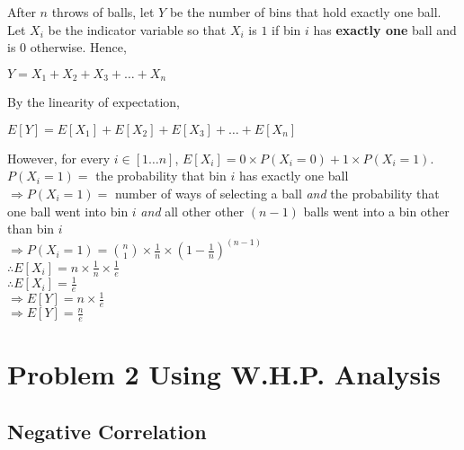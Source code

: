 \documentclass{article}
\begin{document}
After $n$ throws of balls, let $Y$ be the number of bins that hold
exactly one ball. Let $X_i$ be the indicator variable so that $X_i$ is
$1$ if bin $i$ has \textbf{exactly one} ball and is $0$
otherwise. Hence,

$Y = X_1 + X_2 + X_3 + \ldots{} + X_n$

By the linearity of expectation,

$E[Y] = E[X_1] + E[X_2] + E[X_3] + \ldots{} + E[X_n]$

However, for every $i \in [1\ldots{}n]$, $E[X_i] = 0 \times P(X_i = 0)
+ 1 \times P(X_i = 1)$.\\
$P(X_i = 1) = $ the probability that bin $i$ has exactly one ball\\
$\Rightarrow P(X_i = 1) = $ number of ways of selecting a ball \textit{and} the probability that one ball went into
bin $i$ \textit{and} all other other $(n-1)$ balls went into a bin other than
bin $i$\\
$\Rightarrow P(X_i = 1) = \binom{n}{1} \times \frac{1}{n} \times (1 - \frac{1}{n})^{(n-1)}$\\
$\therefore E[X_i] = n \times \frac{1}{n} \times \frac{1}{e}$\\
$\therefore E[X_i] = \frac{1}{e}$\\
$\Rightarrow E[Y] = n \times \frac{1}{e}$\\
$\Rightarrow E[Y] = \frac{n}{e}$

\clearpage

\section {Problem 2 Using W.H.P. Analysis}

\subsection{Negative Correlation}
\end{document}
